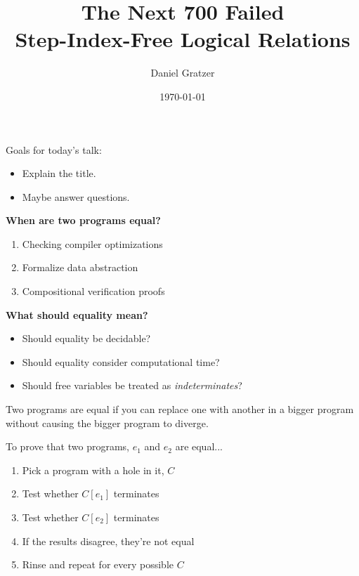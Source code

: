 \documentclass{beamer}
\title{The Next 700 Failed \\Step-Index-Free Logical Relations}
\author{Daniel Gratzer}
\date{\today}
\begin{document}
\begin{frame}
  \titlepage
\end{frame}

\begin{frame}
  \centering
  Goals for today's talk:
  \begin{itemize}
  \item Explain the title.
  \item Maybe answer questions.
  \end{itemize}
\end{frame}

\begin{frame}
  \begin{center}
    \bf When are two programs \alert<5>{equal}?
  \end{center}
  \begin{enumerate}
  \item<2-> Checking compiler optimizations
  \item<3-> Formalize data abstraction
  \item<4-> Compositional verification proofs
  \end{enumerate}
\end{frame}

\begin{frame}
  \begin{center}
    \bf What should equality mean?
  \end{center}
  \pause
  \begin{itemize}
  \item Should equality be decidable?
    \pause
  \item Should equality consider computational time?
    \pause
  \item Should free variables be treated as \emph{indeterminates}?
  \end{itemize}
\end{frame}

\begin{frame}
  \begin{center}
    Two programs are equal if you can replace one with another in a
    bigger program without causing the bigger program to diverge.
  \end{center}
\end{frame}

\begin{frame}
  \centering
  To prove that two programs, $e_1$ and $e_2$ are equal...
  \begin{enumerate}
  \item Pick a program with a hole in it, $C$
  \item Test whether $C[e_1]$ terminates
  \item Test whether $C[e_2]$ terminates
  \item If the results disagree, they're not equal
    \pause
  \item Rinse and repeat for every possible $C$
  \end{enumerate}
\end{frame}
\end{document}
